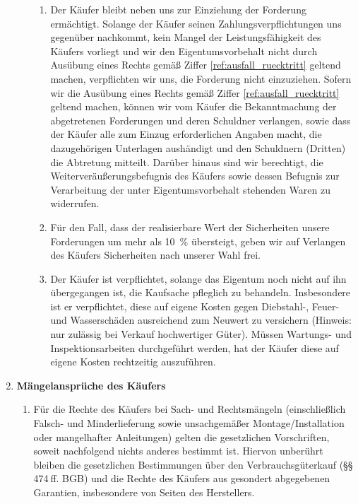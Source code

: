 \documentclass[%
    a4paper,%
    10pt,
]{scrartcl}
\begin{document}
\begin{multicols}{2}
\begin{enumerate}
\begin{enumerate}
\begin{enumerate}
            \item \label{ref:kaeufer_forderung}Der Käufer bleibt neben uns zur Einziehung der Forderung ermächtigt. Solange der Käufer seinen Zahlungsverpflichtungen uns gegenüber nachkommt, kein Mangel der Leistungsfähigkeit des Käufers vorliegt und wir den Eigentumsvorbehalt nicht durch Ausübung eines Rechts gemäß Ziffer \ref{ref:ausfall_ruecktritt} geltend machen, verpflichten wir uns, die Forderung nicht einzuziehen. Sofern wir die Ausübung eines Rechts gemäß Ziffer \ref{ref:ausfall_ruecktritt} geltend machen, können wir vom Käufer die Bekanntmachung der abgetretenen Forderungen und deren Schuldner verlangen, sowie dass der Käufer alle zum Einzug erforderlichen Angaben macht, die dazugehörigen Unterlagen aushändigt und den Schuldnern (Dritten) die Abtretung mitteilt. Darüber hinaus sind wir berechtigt, die Weiterveräußerungsbefugnis des Käufers sowie dessen Befugnis zur Verarbeitung der unter Eigentumsvorbehalt stehenden Waren zu widerrufen.
            \item Für den Fall, dass der realisierbare Wert der Sicherheiten unsere Forderungen um mehr als \qty{10}{\percent} übersteigt, geben wir auf Verlangen des Käufers Sicherheiten nach unserer Wahl frei.
            \item Der Käufer ist verpflichtet, solange das Eigentum noch nicht auf ihn übergegangen ist, die Kaufsache pfleglich zu behandeln. Insbesondere ist er verpflichtet, diese auf eigene Kosten gegen Diebstahl-, Feuer- und Wasserschäden ausreichend zum Neuwert zu versichern (Hinweis: nur zulässig bei Verkauf hochwertiger Güter). Müssen Wartungs- und Inspektionsarbeiten durchgeführt werden, hat der Käufer diese auf eigene Kosten rechtzeitig auszuführen.
            \end{enumerate}
          \end{enumerate}
          \item \textbf{Mängelansprüche des Käufers}%
            \begin{enumerate}
             \item Für die Rechte des Käufers bei Sach- und Rechtsmängeln (einschließlich Falsch- und Minderlieferung sowie unsachgemäßer Montage/Installation oder mangelhafter Anleitungen) gelten die gesetzlichen Vorschriften, soweit nachfolgend nichts anderes bestimmt ist. Hiervon unberührt bleiben die gesetzlichen Bestimmungen über den Verbrauchsgüterkauf (§§ 474 ff. BGB) und die Rechte des Käufers aus gesondert abgegebenen Garantien, insbesondere von Seiten des Herstellers.

\end{enumerate}
\end{enumerate}
\end{multicols}
\end{document}

